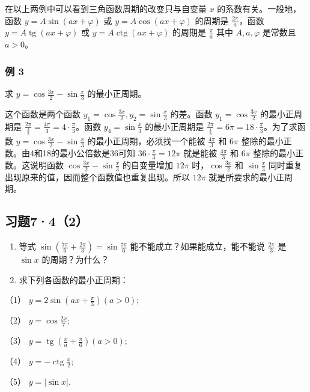 在以上两例中可以看到三角函数周期的改变只与自变量 \(x\)
的系数有关。一般地，函数 \(y = A\sin (ax + \varphi)\) 或
\(y = A\cos (ax + \varphi)\) 的周期是 \(\frac{2\pi}{a}\)，函数
\(y = A\operatorname{tg}(ax + \varphi)\) 或
\(y = A\operatorname{ctg}(ax + \varphi)\) 的周期是 \(\frac{\pi}{a}\)
其中 \(A, a, \varphi\) 是常数且 \(a > 0\)。

\subsubsection{例 3}

求 \(y = \cos \frac{3x}{2} - \sin \frac{x}{3}\) 的最小正周期。

 这个函数是两个函数
\(y_1 = \cos \frac{3x}{2}, y_2 = \sin \frac{x}{3}\) 的差。函数
\(y_1 = \cos \frac{3x}{2}\) 的最小正周期是
\(\frac{2\pi}{\frac{3}{2}} = \frac{4\pi}{3} = 4 \cdot \frac{\pi}{3}\)。函数
\(y_4 = \sin \frac{x}{3}\) 的最小正周期是
\(\frac{2\pi}{\frac{1}{3}} = 6\pi = 18 \cdot \frac{\pi}{3}\)。为了求函数
\(y = \cos \frac{3x}{2} - \sin \frac{x}{3}\)
的最小正周期，必须找一个能被 \(\frac{4\pi}{3}\) 和 \(6\pi\)
整除的最小正数。由4和18的最小公倍数是36可知
\(36 \cdot \frac{\pi}{3} = 12\pi\) 就是能被 \(\frac{4\pi}{3}\) 和
\(6\pi\) 整除的最小正数。这说明函数
\(\cos \frac{3x}{2} - \sin \frac{x}{3}\) 的自变量增加 \(12\pi\)
时，\(\cos \frac{3x}{2}\) 和 \(\sin \frac{x}{3}\)
同时重复出现原来的值，因而整个函数值也重复出现。所以 \(12\pi\)
就是所要求的最小正周期。

\subsection{习题7·4（2）}

\begin{enumerate}
\item
  等式
  \(\sin \left(\frac{7\pi}{6} + \frac{2\pi}{3}\right) = \sin \frac{7\pi}{6}\)
  能不能成立？如果能成立，能不能说 \(\frac{2\pi}{3}\) 是 \(\sin x\)
  的周期？为什么？
\item
  求下列各函数的最小正周期：
\end{enumerate}

（1） \(y = 2\sin \left(ax + \frac{\pi}{3}\right)(a > 0);\)

（2） \(y = \cos \frac{2x}{7};\)

（3）
\(y = \operatorname{tg}\left(\frac{x}{a} + \frac{\pi}{6}\right)(a > 0);\)

（4） \(y = -\operatorname{ctg}\frac{x}{2};\)

（5） \(y = |\sin x|\).

